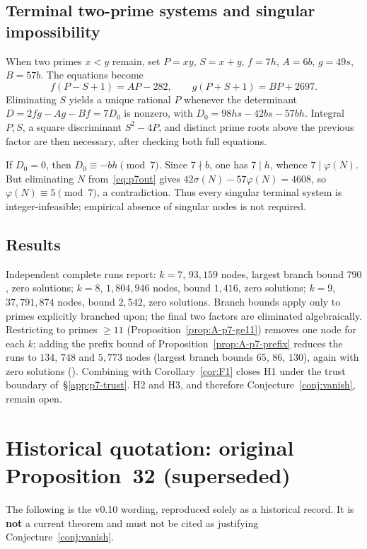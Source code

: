 \documentclass[11pt,reqno]{amsart}
\newcommand{\ph}{\varphi}
\newcommand{\sig}{\sigma}
\theoremstyle{definition}
\begin{document}
\subsection{Terminal two-prime systems and singular impossibility}
When two primes \(x<y\) remain, set \(P=xy\), \(S=x+y\), \(f=7h\), \(A=6b\), \(g=49s\), \(B=57b\). The equations become
\[
f(P-S+1)=AP-282,\qquad g(P+S+1)=BP+2697.
\]
Eliminating \(S\) yields a unique rational \(P\) whenever the determinant \(D=2fg-Ag-Bf=7D_0\) is nonzero, with \(D_0=98hs-42bs-57bh\). Integral \(P,S\), a square discriminant \(S^2-4P\), and distinct prime roots above the previous factor are then necessary, after checking both full equations.

If \(D_0=0\), then \(D_0\equiv -bh\pmod 7\). Since \(7\nmid b\), one has \(7\mid h\), whence \(7\mid\ph(N)\). But eliminating \(N\) from~\eqref{eq:p7out} gives \(42\sig(N)-57\ph(N)=4608\), so \(\ph(N)\equiv 5\pmod 7\), a contradiction. Thus every singular terminal system is integer-infeasible; empirical absence of singular nodes is not required.

\subsection{Results}
Independent complete runs report: \(k=7\), \(93{,}159\) nodes, largest branch bound \(790\), zero solutions; \(k=8\), \(1{,}804{,}946\) nodes, bound \(1{,}416\), zero solutions; \(k=9\), \(37{,}791{,}874\) nodes, bound \(2{,}542\), zero solutions. Branch bounds apply only to primes explicitly branched upon; the final two factors are eliminated algebraically. Restricting to primes \(\ge 11\) (Proposition~\ref{prop:A-p7-ge11}) removes one node for each \(k\); adding the prefix bound of Proposition~\ref{prop:A-p7-prefix} reduces the runs to \(134\), \(748\) and \(5{,}773\) nodes (largest branch bounds \(65\), \(86\), \(130\)), again with zero solutions (). Combining with Corollary~\ref{cor:F1} closes H1 under the trust boundary of~\S\ref{app:p7-trust}. H2 and H3, and therefore Conjecture~\ref{conj:vanish}, remain open.

\section{Historical quotation: original Proposition~32 (superseded)}
\label{app:hist-prop32}

The following is the v0.10 wording, reproduced solely as a historical record. It is \textbf{not} a current theorem and must not be cited as justifying Conjecture~\ref{conj:vanish}.
\end{document}
